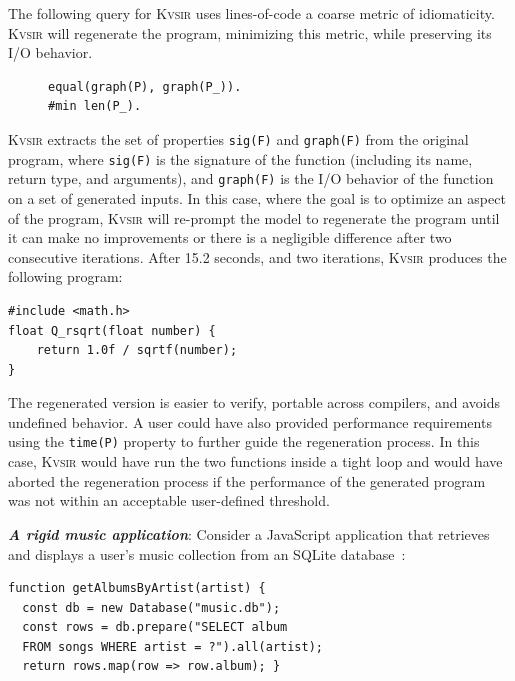 \documentclass[noacm,sigplan,review]{acmart}
\newcommand{\sys}{{\scshape Kv{\textalpha}sir}\xspace}
\newcommand{\heading}[1]{\vspace{2pt}\noindent\textbf{\emph{#1}}:\enspace}
\newcommand{\ttt}[1]{\texttt{#1}\xspace}
\begin{document}
The following query for \sys uses lines-of-code a coarse metric of
idiomaticity. \sys will regenerate the program, minimizing this metric, while
preserving its I/O behavior.
\begin{figure}
  \vspace{-5pt}
  \begin{verbatim}
equal(graph(P), graph(P_)).
#min len(P_).
  \end{verbatim}
\end{figure}
\sys extracts the set of properties \ttt{sig(F)} and \ttt{graph(F)} from the original program, where \texttt{sig(F)} is the
signature of the function (including its name, return type, and arguments), and \texttt{graph(F)} is the I/O behavior of the function
on a set of generated inputs.
In this case, where the goal is to optimize an aspect of the program, \sys will re-prompt
the model to regenerate the program until it can make no improvements or there is a negligible difference after two consecutive iterations.
After 15.2 seconds, and two iterations, \sys produces the following program:
\begin{verbatim}
#include <math.h>
float Q_rsqrt(float number) {
    return 1.0f / sqrtf(number);
}
\end{verbatim}
The regenerated version is easier to verify, portable across compilers, and
avoids undefined behavior.
A user could have also provided performance requirements using 
the \ttt{time(P)} property to further guide the regeneration process.
In this case, \sys would have run the two functions inside a tight loop and 
would have aborted the regeneration process if the performance of the generated
program was not within an acceptable user-defined threshold.

\heading{A rigid music application}
Consider a JavaScript application that retrieves and displays a user's music
collection from an SQLite database~\cite{codewithsadeemusicplayer, beets}:

\begin{verbatim}
function getAlbumsByArtist(artist) {
  const db = new Database("music.db");
  const rows = db.prepare("SELECT album
  FROM songs WHERE artist = ?").all(artist);
  return rows.map(row => row.album); }
\end{verbatim}
\end{document}
